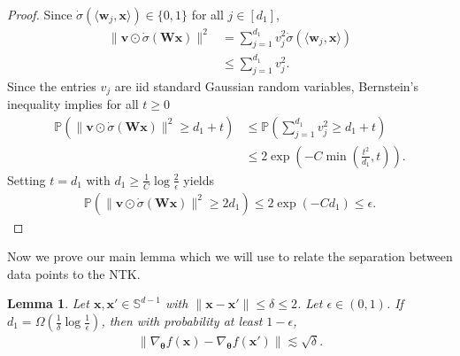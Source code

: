 \documentclass{article}
\newtheorem{lemma}[theorem]{Lemma}
\theoremstyle{definition}
\renewcommand{\P}{\mathbb{P}}
\renewcommand{\S}{\mathbb{S}}
\def\vtheta{{\bm{\theta}}}
\def\vv{{\bm{v}}}
\def\vw{{\bm{w}}}
\def\vx{{\bm{x}}}
\def\mW{{\bm{W}}}
\begin{document}
\begin{proof}
    Since $\dot{\sigma}(\langle \vw_j, \vx \rangle) \in \{0, 1\}$ for all $j \in [d_1]$,
    \begin{align*}
        \|\vv \odot \dot{\sigma}(\mW \vx)\|^2 &= \sum_{j = 1}^{d_1} v_j^2 \dot{\sigma}(\langle \vw_j, \vx \rangle)\\
        &\leq \sum_{j = 1}^{d_1}v_j^2.
    \end{align*}
    Since the entries $v_j$ are iid standard Gaussian random variables, Bernstein's inequality implies for all $t \geq 0$
    \begin{align*}
        \P(\|\vv \odot \dot{\sigma}(\mW \vx)\|^2 \geq d_1 + t) &\leq \P\left(\sum_{j = 1}^{d_1}v_j^2 \geq d_1 + t\right)\\
        &\leq 2\exp\left(-C\min\left(\frac{t^2}{d_1}, t \right) \right).
    \end{align*}
    Setting $t = d_1$ with $d_1 \geq \frac{1}{C} \log \frac{2}{\epsilon}$ yields
    \begin{align*}
        \P(\|\vv \odot \dot{\sigma}(\mW \vx)\|^2 \geq 2d_1) \leq 2 \exp(-C d_1) \leq \epsilon.
    \end{align*}
    
\end{proof}
Now we prove our main lemma which we will use to relate the separation between data points to the NTK.
\begin{lemma}\label{lemma:separation-gradient-shallow}
    Let $\vx, \vx' \in \S^{d-1}$ with $\|\vx - \vx'\| \leq \delta \leq 2$. Let $\epsilon \in (0, 1)$. If $d_1 = \Omega\left(\frac{1}{\delta} \log \frac{1}{\epsilon}\right)$, then with probability at least $1 - \epsilon$,
    \begin{align*}
        \|\nabla_{\vtheta} f(\vx) - \nabla_{\vtheta} f(\vx')\| \lesssim \sqrt{\delta}.
    \end{align*}
\end{lemma}
\end{document}
